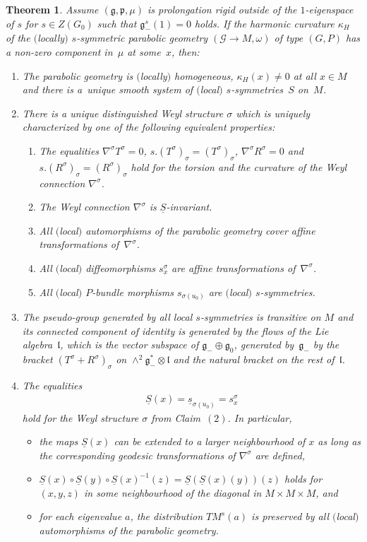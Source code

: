 \documentclass[10pt,a4paper]{amsart}
\newcommand{\om}{\omega}
\newcommand{\si}{\sigma}
\newcommand{\un}{\underline}
\newcommand{\ba}{\mathcal{G}}
\newcommand{\fg}{\mathfrak g}
\newcommand{\fp}{\mathfrak p}
\newcommand{\fl}{\mathfrak l}
\numberwithin{equation}{section}
\newtheorem{Theorem}{Theorem}[section]
\begin{document}
\begin{Theorem} \label{6.2}
Assume $(\fg,\fp,\mu)$ is prolongation rigid outside of the $1$-eigenspace of $s$ for $s\in Z(G_0)$ such that $\fg_-^s(1)=0$ holds. If the harmonic curvature $\kappa_H$ of the $($locally$)$ $s$-symmetric parabolic geometry $(\ba\to M,\om)$ of type $(G,P)$ has a non-zero component in~$\mu$ at some~$x$, then:
\begin{enumerate}\itemsep=0pt
\item[$1.$] The parabolic geometry is $($locally$)$ homogeneous, $\kappa_H(x)\neq 0$ at all $x\in M$ and there is a~unique smooth system of $($local$)$ $s$-symmetries~$S$ on~$M$.
\item[$2.$] There is a unique distinguished Weyl structure $\si$ which is uniquely characterized by one of the following equivalent properties:
\begin{enumerate}\itemsep=0pt
\item[$(a)$] The equalities $\nabla^\si T^\si=0$, $s.(T^\si)_\si=(T^\si)_\si$, $\nabla^\si R^\si=0$ and $s.(R^\si)_\si=(R^\si)_\si$ hold for the torsion and the curvature of the Weyl connection $\nabla^\si$.
\item[$(b)$] The Weyl connection $\nabla^\si$ is $\un S$-invariant.
\item[$(c)$] All $($local$)$ automorphisms of the parabolic geometry cover affine transformations of~$\nabla^\si$.
\item[$(d)$] All $($local$)$ diffeomorphisms $s_x^\si$ are affine transformations of~$\nabla^\si$.
\item[$(e)$] All $($local$)$ $P$-bundle morphisms $s_{\si(u_0)}$ are $($local$)$ $s$-symmetries.
\end{enumerate}
\item[$3.$] The pseudo-group generated by all local $s$-symmetries is transitive on $M$ and its connected component of identity is generated by the flows of the Lie algebra~$\fl$, which is the vector subspace of $\fg_-\oplus \fg_0$, generated by~$\fg_-$ by the bracket $(T^\si+R^\si)_\si$ on $\wedge^2 \fg_-^*\otimes \fl$ and the natural bracket on the rest of~$\fl$.
\item[$4.$] The equalities \begin{gather*}\un S(x)=\un s_{\si(u_0)}=s_x^\si\end{gather*}
hold for the Weyl structure $\si$ from Claim~$(2)$. In particular,
\begin{itemize}\itemsep=0pt
\item the maps $\un S(x)$ can be extended to a larger neighbourhood of $x$ as long as the corresponding geodesic transformations of $\nabla^\si$ are defined,
\item $\un S(x)\circ \un S(y)\circ \un S(x)^{-1}(z)=\un S(\un S(x)(y))(z)$ holds for $(x,y,z)$ in some neighbourhood of the diagonal in $M\times M\times M$, and
\item for each eigenvalue $a$, the distribution $TM^s(a)$ is preserved by all $($local$)$ automorphisms of the parabolic geometry.
\end{itemize}
\end{enumerate}
\end{Theorem}
\end{document}
